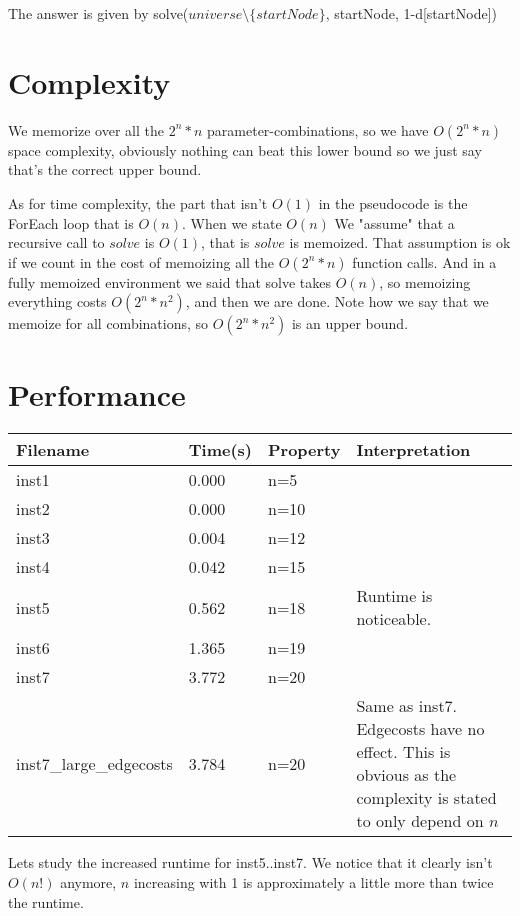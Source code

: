 \documentclass[a4paper,11pt]{article}
\begin{document}
The answer is given by
solve($universe \setminus \{startNode\}$, startNode, 1-d[startNode])

\section{Complexity}
We memorize over all the $2^n*n$ parameter-combinations, so we
have $O(2^n*n)$ space complexity, obviously nothing can beat this
lower bound so we just say that's the correct upper bound.

As for time complexity, the part that isn't $O(1)$
in the pseudocode is the ForEach loop that is $O(n)$.
When we state $O(n)$ We "assume" that a recursive call to $solve$
is $O(1)$, that is $solve$ is memoized.
That assumption is ok if we count in the cost of memoizing all
the $O(2^n*n)$ function calls. And in a fully memoized
environment we said that solve takes $O(n)$, so memoizing
everything costs $O(2^n*n^2)$, and then we are done.
Note how we say that we memoize for all combinations,
so $O(2^n*n^2)$ is an upper bound.

\section{Performance}

\begin{center}
    \begin{tabular}{ | l | l | p{4cm} | p{5cm} |}
    \hline
    Filename & Time(s) & Property & Interpretation \\ \hline
    inst1 & 0.000 & n=5 & \\ \hline
    inst2 & 0.000 & n=10 & \\ \hline
    inst3 & 0.004 & n=12 & \\ \hline
    inst4 & 0.042 & n=15 & \\ \hline
    inst5 & 0.562 & n=18 & Runtime is noticeable. \\ \hline
    inst6 & 1.365 & n=19 & \\ \hline
    inst7 & 3.772 & n=20 & \\ \hline
    inst7\_large\_edgecosts & 3.784 & n=20 & Same as inst7. Edgecosts have no effect.
        This is obvious as the complexity is stated to only depend on $n$ \\ \hline
    \end{tabular}
\end{center}

Lets study the increased runtime for inst5..inst7.
We notice that it clearly isn't $O(n!)$ anymore, $n$ increasing with 1
is approximately a little more than twice the runtime.
\end{document}
